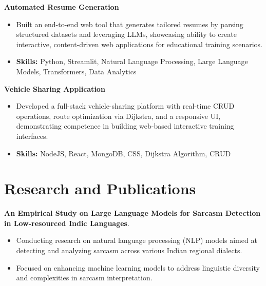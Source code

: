 \documentclass[a4paper,11pt]{article}
\begin{document}
\vspace{1mm}
  \textbf{Automated Resume Generation  }
\vspace{-1.5mm} %
\begin{itemize}
  \item Built an end-to-end web tool that generates tailored resumes by parsing structured datasets and leveraging LLMs, showcasing ability to create interactive, content-driven web applications for educational training scenarios.
\vspace{-3mm}
  \item \textbf{Skills:} Python, Streamlit, Natural Language Processing, Large Language Models, Transformers, Data Analytics
\end{itemize}


\vspace{1mm}
   \textbf{Vehicle Sharing Application }
\vspace{-1.5mm} %
\begin{itemize}
  \item Developed a full-stack vehicle-sharing platform with real-time CRUD operations, route optimization via Dijkstra, and a responsive UI, demonstrating competence in building web-based interactive training interfaces.
\vspace{-3mm}
  \item \textbf{Skills:} NodeJS, React, MongoDB, CSS, Dijkstra Algorithm, CRUD
\end{itemize}



\section{\textbf{Research and Publications} \hfill }
\vspace{1mm}
  \textbf{An Empirical Study on Large Language Models for Sarcasm Detection in Low-resourced Indic Languages}.
\vspace{-1mm} %
\begin{itemize}
  \item Conducting research on natural language processing (NLP) models aimed at detecting and analyzing sarcasm across various Indian regional dialects.
\vspace{-3mm}
  \item Focused on enhancing machine learning models to address linguistic diversity and complexities in sarcasm interpretation.
\end{itemize}
\end{document}
